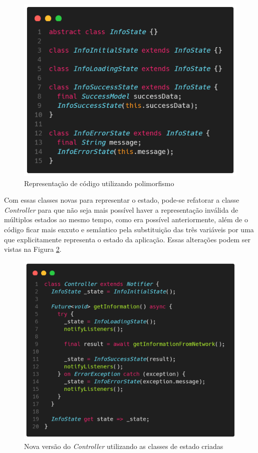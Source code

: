 \documentclass[12pt, %
openright, 
oneside, %
a4paper,    %
brazil]{facom-ufu-abntex2}
\begin{document}
\begin{figure}[ht]
    \centering
    \includegraphics[width=.65\textwidth, trim={0 30 0 100}, clip]{figures/states/states.png}
    \caption{Representação de código utilizando polimorfismo}
    \label{fig:states}

\end{figure}
Com essas classes novas para representar o estado, pode-se refatorar a classe \textit{Controller} para que não seja mais possível haver a representação inválida de múltiplos estados ao mesmo tempo, como era possível anteriormente, além de o código ficar mais enxuto e semântico pela substituição das três variáveis por uma que explicitamente representa o estado da aplicação. Essas alterações podem ser vistas na Figura \ref{fig:controller_with_states}.

\begin{figure}[ht]
    \centering
    \includegraphics[width=.65\textwidth, trim={0 30 0 100}, clip]{figures/states/controller_with_states.png}
    \caption{Nova versão do \textit{Controller} utilizando as classes de estado criadas}
    \label{fig:controller_with_states}
\end{figure}
\end{document}
